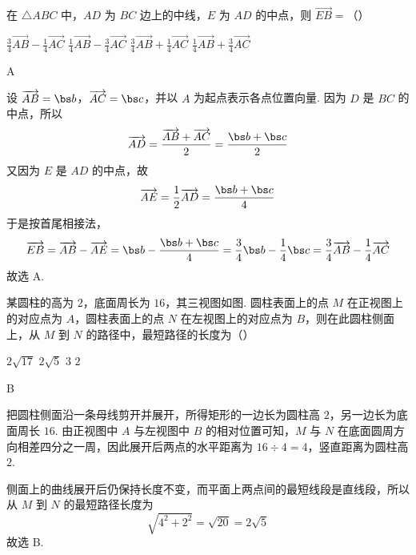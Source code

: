 \begin{problem}
在 \(\triangle ABC\) 中，\(AD\) 为 \(BC\) 边上的中线，\(E\) 为 \(AD\) 的中点，则 \(\overrightarrow{EB}=\)（\quad）

\choices
    {\(\frac34\overrightarrow{AB}-\frac14\overrightarrow{AC}\)}
    {\(\frac14\overrightarrow{AB}-\frac34\overrightarrow{AC}\)}
    {\(\frac34\overrightarrow{AB}+\frac14\overrightarrow{AC}\)}
    {\(\frac14\overrightarrow{AB}+\frac34\overrightarrow{AC}\)}
\end{problem}

\begin{answer}
A
\end{answer}

\begin{solution}
设 \(\overrightarrow{AB}=\bs b\)，\(\overrightarrow{AC}=\bs c\)，并以 \(A\) 为起点表示各点位置向量. 因为 \(D\) 是 \(BC\) 的中点，所以
\[
\overrightarrow{AD}=\frac{\overrightarrow{AB}+\overrightarrow{AC}}{2}
 =\frac{\bs b+\bs c}{2}
\]
又因为 \(E\) 是 \(AD\) 的中点，故
\[
\overrightarrow{AE}=\frac12\overrightarrow{AD}
 =\frac{\bs b+\bs c}{4}
\]
于是按首尾相接法，
\[
\overrightarrow{EB}=\overrightarrow{AB}-\overrightarrow{AE}
 =\bs b-\frac{\bs b+\bs c}{4}
 =\frac34\bs b-\frac14\bs c
 =\frac34\overrightarrow{AB}-\frac14\overrightarrow{AC}
\]
故选 A.
\end{solution}

\begin{problem}
某圆柱的高为 \(2\)，底面周长为 \(16\)，其三视图如图. 圆柱表面上的点 \(M\) 在正视图上的对应点为 \(A\)，圆柱表面上的点 \(N\) 在左视图上的对应点为 \(B\)，则在此圆柱侧面上，从 \(M\) 到 \(N\) 的路径中，最短路径的长度为（\quad）


\choices
    {\(2\sqrt{17}\)}
    {\(2\sqrt5\)}
    {\(3\)}
    {\(2\)}
\end{problem}

\begin{answer}
B
\end{answer}

\begin{solution}
把圆柱侧面沿一条母线剪开并展开，所得矩形的一边长为圆柱高 \(2\)，另一边长为底面周长 \(16\). 由正视图中 \(A\) 与左视图中 \(B\) 的相对位置可知，\(M\) 与 \(N\) 在底面圆周方向相差四分之一周，因此展开后两点的水平距离为 \(16\div4=4\)，竖直距离为圆柱高 \(2\).

侧面上的曲线展开后仍保持长度不变，而平面上两点间的最短线段是直线段，所以从 \(M\) 到 \(N\) 的最短路径长度为
\[
\sqrt{4^2+2^2}=\sqrt{20}=2\sqrt5
\]
故选 B.
\end{solution}

